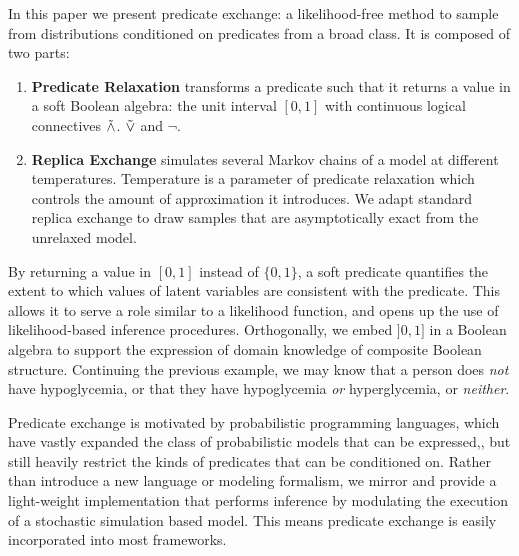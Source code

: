 In this paper we present predicate exchange:
a likelihood-free method to sample from distributions conditioned on predicates from a broad class.
It is composed of two parts:
\begin{enumerate}
\item \textbf{Predicate Relaxation} transforms a predicate such that it returns a value in a soft Boolean algebra: the unit interval $[0, 1]$ with continuous logical connectives $\mathrel{\tilde{\land}}$. $\mathrel{\tilde{\lor}}$ and $\neg$.
\item  \textbf{Replica Exchange} simulates several Markov chains of a model at different temperatures.  Temperature is a parameter of predicate relaxation which controls the amount of approximation it introduces.  We adapt standard replica exchange to draw samples that are asymptotically exact from the unrelaxed model. 
\end{enumerate}

By returning a value in $[0, 1]$ instead of $\{0, 1\}$, a soft predicate quantifies the extent to which values of latent variables are consistent with the predicate.
This allows it to serve a role similar to a likelihood function, and opens up the use of likelihood-based inference procedures.
Orthogonally, we embed $]0, 1]$ in a Boolean algebra to support the expression of domain knowledge of composite Boolean structure.
Continuing the previous example, we may know that a person does \emph{not} have hypoglycemia, or that they have hypoglycemia \emph{or} hyperglycemia, or \emph{neither}.


Predicate exchange is motivated by probabilistic programming languages, which have vastly expanded the class of probabilistic models that can be expressed,, but still heavily restrict the kinds of predicates that can be conditioned on.
Rather than introduce a new language or modeling formalism, we mirror   \cite{wingate2011lightweight} and provide a light-weight implementation that performs inference by modulating the execution of a stochastic simulation based model.
This means predicate exchange is easily incorporated into most frameworks. 


